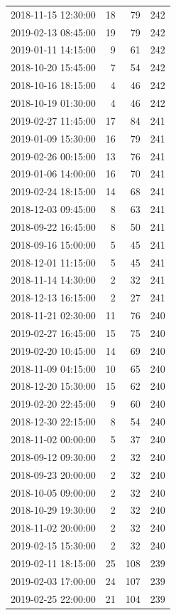 \begin{tabular}{lrrr}
2018-11-15 12:30:00 & 18 & 79 & 242 \\
2019-02-13 08:45:00 & 19 & 79 & 242 \\
2019-01-11 14:15:00 & 9 & 61 & 242 \\
2018-10-20 15:45:00 & 7 & 54 & 242 \\
2018-10-16 18:15:00 & 4 & 46 & 242 \\
2018-10-19 01:30:00 & 4 & 46 & 242 \\
2019-02-27 11:45:00 & 17 & 84 & 241 \\
2019-01-09 15:30:00 & 16 & 79 & 241 \\
2019-02-26 00:15:00 & 13 & 76 & 241 \\
2019-01-06 14:00:00 & 16 & 70 & 241 \\
2019-02-24 18:15:00 & 14 & 68 & 241 \\
2018-12-03 09:45:00 & 8 & 63 & 241 \\
2018-09-22 16:45:00 & 8 & 50 & 241 \\
2018-09-16 15:00:00 & 5 & 45 & 241 \\
2018-12-01 11:15:00 & 5 & 45 & 241 \\
2018-11-14 14:30:00 & 2 & 32 & 241 \\
2018-12-13 16:15:00 & 2 & 27 & 241 \\
2018-11-21 02:30:00 & 11 & 76 & 240 \\
2019-02-27 16:45:00 & 15 & 75 & 240 \\
2019-02-20 10:45:00 & 14 & 69 & 240 \\
2018-11-09 04:15:00 & 10 & 65 & 240 \\
2018-12-20 15:30:00 & 15 & 62 & 240 \\
2019-02-20 22:45:00 & 9 & 60 & 240 \\
2018-12-30 22:15:00 & 8 & 54 & 240 \\
2018-11-02 00:00:00 & 5 & 37 & 240 \\
2018-09-12 09:30:00 & 2 & 32 & 240 \\
2018-09-23 20:00:00 & 2 & 32 & 240 \\
2018-10-05 09:00:00 & 2 & 32 & 240 \\
2018-10-29 19:30:00 & 2 & 32 & 240 \\
2018-11-02 20:00:00 & 2 & 32 & 240 \\
2019-02-15 15:30:00 & 2 & 32 & 240 \\
2019-02-11 18:15:00 & 25 & 108 & 239 \\
2019-02-03 17:00:00 & 24 & 107 & 239 \\
2019-02-25 22:00:00 & 21 & 104 & 239 \\

\end{tabular}
